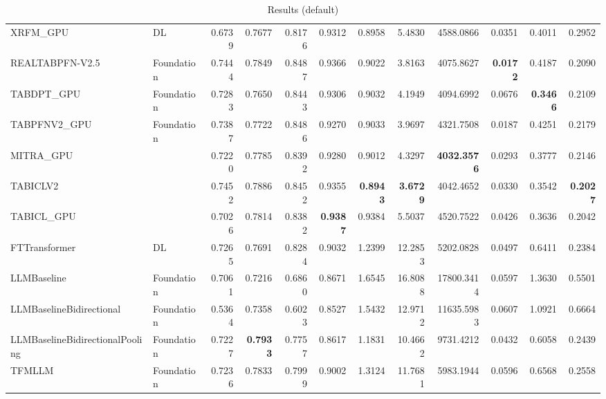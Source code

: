 \begin{table}[htbp]
{\begin{tabular}{ll|rrrrrrrrrr}
XRFM\_GPU & DL & 0.6739 & 0.7677 & 0.8176 & 0.9312 & 0.8958 & 5.4830 & 4588.0866 & 0.0351 & 0.4011 & 0.2952 \\
REALTABPFN-V2.5 & Foundation & 0.7444 & 0.7849 & 0.8487 & 0.9366 & 0.9022 & 3.8163 & 4075.8627 & \textbf{0.0172} & 0.4187 & 0.2090 \\
TABDPT\_GPU & Foundation & 0.7283 & 0.7650 & 0.8443 & 0.9306 & 0.9032 & 4.1949 & 4094.6992 & 0.0676 & \textbf{0.3466} & 0.2109 \\
TABPFNV2\_GPU & Foundation & 0.7387 & 0.7722 & 0.8486 & 0.9270 & 0.9033 & 3.9697 & 4321.7508 & 0.0187 & 0.4251 & 0.2179 \\
MITRA\_GPU &  & 0.7220 & 0.7785 & 0.8392 & 0.9280 & 0.9012 & 4.3297 & \textbf{4032.3576} & 0.0293 & 0.3777 & 0.2146 \\
TABICLV2 &  & 0.7452 & 0.7886 & 0.8452 & 0.9355 & \textbf{0.8943} & \textbf{3.6729} & 4042.4652 & 0.0330 & 0.3542 & \textbf{0.2027} \\
TABICL\_GPU &  & 0.7026 & 0.7814 & 0.8382 & \textbf{0.9387} & 0.9384 & 5.5037 & 4520.7522 & 0.0426 & 0.3636 & 0.2042 \\
\midrule
FTTransformer & DL & 0.7265 & 0.7691 & 0.8284 & 0.9032 & 1.2399 & 12.2853 & 5202.0828 & 0.0497 & 0.6411 & 0.2384 \\
LLMBaseline & Foundation & 0.7061 & 0.7216 & 0.6860 & 0.8671 & 1.6545 & 16.8088 & 17800.3414 & 0.0597 & 1.3630 & 0.5501 \\
LLMBaselineBidirectional & Foundation & 0.5364 & 0.7358 & 0.6023 & 0.8527 & 1.5432 & 12.9712 & 11635.5983 & 0.0607 & 1.0921 & 0.6664 \\
LLMBaselineBidirectionalPooling & Foundation & 0.7227 & \textbf{0.7933} & 0.7757 & 0.8617 & 1.1831 & 10.4662 & 9731.4212 & 0.0432 & 0.6058 & 0.2439 \\
TFMLLM & Foundation & 0.7236 & 0.7833 & 0.7999 & 0.9002 & 1.3124 & 11.7681 & 5983.1944 & 0.0596 & 0.6568 & 0.2558 \\
\bottomrule
\end{tabular}
}
\caption{Results (default)}
\label{tab:results_default}
\end{table}